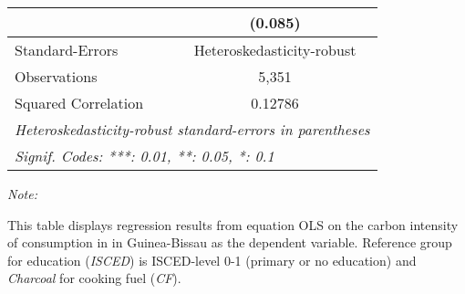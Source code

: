 \begin{table}[htbp!]
\begin{adjustbox}{width = 1\textwidth, max height = 0.95\textheight, center}
\begin{threeparttable}[b]
\begin{tabular}{lc}
                                & (0.085)\\   
            \midrule 
            Standard-Errors     & Heteroskedasticity-robust \\   
            Observations        & 5,351\\  
            Squared Correlation & 0.12786\\  
            \midrule \midrule
            \multicolumn{2}{l}{\emph{Heteroskedasticity-robust standard-errors in parentheses}}\\
            \multicolumn{2}{l}{\emph{Signif. Codes: ***: 0.01, **: 0.05, *: 0.1}}\\
         \end{tabular}
         
         \begin{tablenotes}\item \medskip \textit{Note:}
            \item This table displays regression results from equation OLS on the carbon intensity of consumption in  in Guinea-Bissau as the dependent variable. Reference group for education (\textit{ISCED}) is ISCED-level 0-1 (primary or no education) and \textit{Charcoal} for cooking fuel (\textit{CF}).
         \end{tablenotes}
      \end{threeparttable}
   \end{adjustbox}
\end{table}



